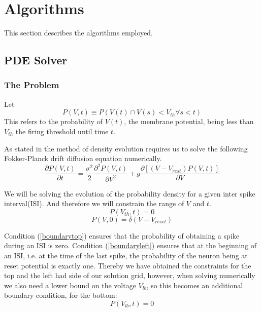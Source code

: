\documentclass[10pt]{article}
\begin{document}
\section{Algorithms}

This section describes the algorithms employed.

\subsection{PDE Solver}

\subsubsection{The Problem}
Let 
\begin{equation}
    P(V,t) \equiv P(V(t) \cap  V(s) < V_{th} \forall s < t)
\end{equation}
This refers to the probability of $V(t)$, the membrane potential,
being less than $V_{th}$ the firing threshold until time $t$.  

As stated in \cite{PaninskiPillowSimoncelli} the method of density
evolution requires us to solve the
following Fokker-Planck drift diffusion equation numerically.
\begin{equation}
    \frac{\partial P(V,t)}{\partial t} =
    \frac{\sigma^2}{2} \frac{\partial^2 P(V,t) } {\partial V^2} +
    g\frac{\partial[(V-V_{rest})P(V,t)]}{\partial V}
    \label{fokkerplanck}
\end{equation}

We will be solving the evolution of the probability density for a
given inter spike interval(ISI). And therefore we will constrain the range
of $V$ and $t$.
\begin{equation}
    P(V_{th},t) = 0
    \label{boundarytop}
\end{equation}
\begin{equation}
    P(V,0) = \delta(V-V_{reset})
    \label{boundaryleft}
\end{equation}

Condition (\ref{boundarytop}) ensures that the probability of obtaining a spike
during an ISI is zero. Condition (\ref{boundaryleft}) ensures
that at the beginning of an ISI, i.e. at the time of the last spike,
the probability of the neuron being at reset potential is exactly one.
Thereby we have obtained the constraints for the top and the left had
side of our solution grid, however, when solving numerically we also
need a lower bound on the voltage $V_{lb}$, so this becomes an
additional boundary condition, for the  bottom:
\begin{equation}
    P(V_{lb},t) = 0 
    \label{boundarybottom}
\end{equation}
\end{document}
